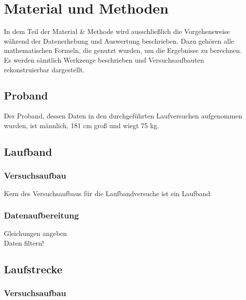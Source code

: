 \section{Material und Methoden}
In dem Teil der Material \& Methode wird ausschließlich die Vorgehensweise während der Datenerhebung und Auswertung beschrieben. Dazu gehören alle mathematischen Formeln, die genutzt wurden, um die Ergebnisse zu berechnen. Es werden sämtlich Werkzeuge beschrieben und Versuchsaufbauten rekonstruierbar dargestellt.

\subsection{Proband}
Der Proband, dessen Daten in den durchgeführten Laufversuchen aufgenommen wurden, ist männlich, 181 cm groß und wiegt 75 kg.
\subsection{Laufband}
\subsubsection{Versuchsaufbau}
Kern des Versuchsaufbaus für die Laufbandversuche ist ein Laufband
\subsubsection{Datenaufbereitung}
Gleichungen angeben\\
Daten filtern!\\
\subsection{Laufstrecke}
\subsubsection{Versuchsaufbau}
